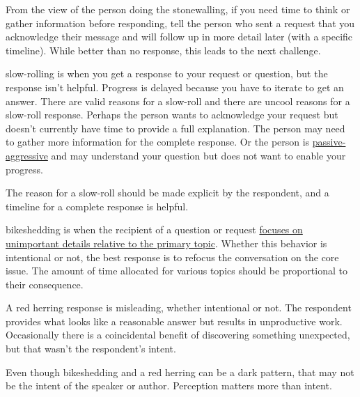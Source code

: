 From the view of the person doing the stonewalling, if you need time to think or gather information before responding, 
tell the person who sent a request that you acknowledge their message and will follow up in more detail later (with a specific timeline). While better than no response, this leads to the next challenge.

\Gls{slow-rolling}
is when you get a response to your request or question, but the response isn't helpful. Progress is delayed because you have to iterate to get an answer. There are valid reasons for a slow-roll and there are uncool reasons for a slow-roll response. Perhaps the person wants to acknowledge your request but doesn't currently have time to provide a full explanation. The person may need to gather more information for the complete response. Or the person is \href{https://en.wikipedia.org/wiki/Passive-aggressive_behavior}{passive-aggressive}
and may understand your question but does not want to enable your progress. 

The reason for a slow-roll should be made explicit by the respondent, 
and a timeline for a complete response is helpful. 


\Gls{bikeshedding} 
is when the recipient of a question or request \href{https://en.wikipedia.org/wiki/Law_of_triviality}{focuses on unimportant details relative to the primary topic}. 
Whether this behavior is intentional or not, the best response is to refocus the conversation on the core issue. The amount of time allocated for various topics should be proportional to their consequence. 

A \gls{red herring}
response is misleading, whether intentional or not. The respondent provides what looks like a reasonable answer but results in unproductive work. Occasionally there is a coincidental benefit of discovering something unexpected, but that wasn't the respondent's intent. 


Even though bikeshedding and a red herring can be a dark pattern, that may not be the intent of the speaker or author. Perception matters more than intent.
